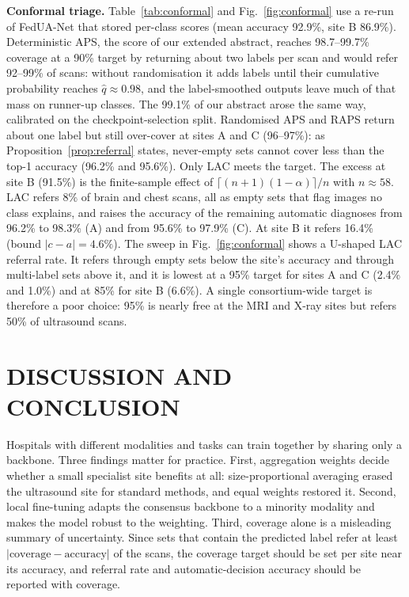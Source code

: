 \documentclass[]{spie}
\begin{document}
\textbf{Conformal triage.} Table~\ref{tab:conformal} and Fig.~\ref{fig:conformal} use a re-run of FedUA-Net that stored per-class scores (mean accuracy 92.9\%, site B 86.9\%). Deterministic APS, the score of our extended abstract, reaches 98.7--99.7\% coverage at a 90\% target by returning about two labels per scan and would refer 92--99\% of scans: without randomisation it adds labels until their cumulative probability reaches $\hat q\approx0.98$, and the label-smoothed outputs leave much of that mass on runner-up classes. The 99.1\% of our abstract arose the same way, calibrated on the checkpoint-selection split. Randomised APS and RAPS return about one label but still over-cover at sites A and C (96--97\%): as Proposition~\ref{prop:referral} states, never-empty sets cannot cover less than the top-1 accuracy (96.2\% and 95.6\%). Only LAC meets the target. The excess at site B (91.5\%) is the finite-sample effect of $\lceil(n+1)(1-\alpha)\rceil/n$ with $n\approx58$. LAC refers 8\% of brain and chest scans, all as empty sets that flag images no class explains, and raises the accuracy of the remaining automatic diagnoses from 96.2\% to 98.3\% (A) and from 95.6\% to 97.9\% (C). At site B it refers 16.4\% (bound $|c-a|=4.6\%$). The sweep in Fig.~\ref{fig:conformal} shows a U-shaped LAC referral rate. It refers through empty sets below the site's accuracy and through multi-label sets above it, and it is lowest at a 95\% target for sites A and C (2.4\% and 1.0\%) and at 85\% for site B (6.6\%). A single consortium-wide target is therefore a poor choice: 95\% is nearly free at the MRI and X-ray sites but refers 50\% of ultrasound scans.

\section{DISCUSSION AND CONCLUSION}
\label{sec:concl}
Hospitals with different modalities and tasks can train together by sharing only a backbone. Three findings matter for practice. First, aggregation weights decide whether a small specialist site benefits at all: size-proportional averaging erased the ultrasound site for standard methods, and equal weights restored it. Second, local fine-tuning adapts the consensus backbone to a minority modality and makes the model robust to the weighting. Third, coverage alone is a misleading summary of uncertainty. Since sets that contain the predicted label refer at least $|\text{coverage}-\text{accuracy}|$ of the scans, the coverage target should be set per site near its accuracy, and referral rate and automatic-decision accuracy should be reported with coverage.
\end{document}
